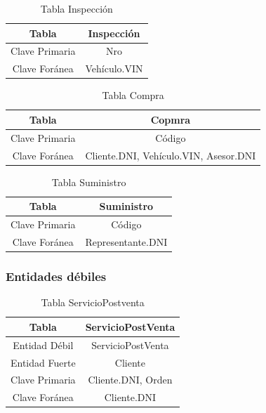 \documentclass[12pt]{article}
\begin{document}
\newpage

\begin{table}[htbp]
\begin{center}
\begin{tabular}{|c|c|}
\hline
Tabla & Inspección \\
\hline
Clave Primaria & Nro \\
\hline
Clave Foránea & Vehículo.VIN \\
\hline
\end{tabular}
\caption{Tabla Inspección}
\end{center}
\end{table}

\begin{table}[htbp]
\begin{center}
\begin{tabular}{|c|c|}
\hline
Tabla & Copmra \\
\hline
Clave Primaria & Código \\
\hline
Clave Foránea & Cliente.DNI, Vehículo.VIN, Asesor.DNI \\
\hline
\end{tabular}
\caption{Tabla Compra}
\end{center}
\end{table}

\begin{table}[htbp]
\begin{center}
\begin{tabular}{|c|c|}
\hline
Tabla & Suministro \\
\hline
Clave Primaria & Código \\
\hline
Clave Foránea & Representante.DNI \\
\hline
\end{tabular}
\caption{Tabla Suministro}
\end{center}
\end{table}

\subsubsection{Entidades d\'ebiles}

\begin{table}[htbp]
\begin{center}
\begin{tabular}{|c|c|}
\hline
Tabla & ServicioPostVenta \\
\hline
Entidad Débil & ServicioPostVenta \\
\hline
Entidad Fuerte & Cliente \\
\hline
Clave Primaria & Cliente.DNI, Orden \\
\hline
Clave Foránea & Cliente.DNI \\
\hline
\end{tabular}
\caption{Tabla ServicioPostventa}
\end{center}
\end{table}
\end{document}
